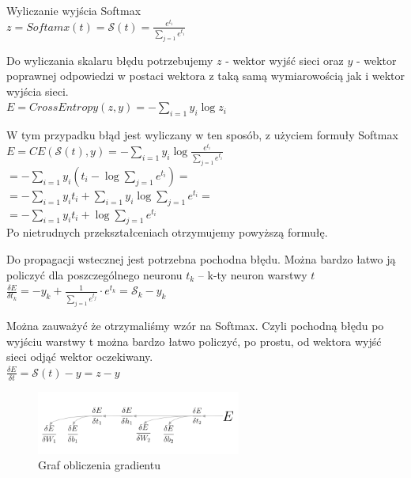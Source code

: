 \documentclass{article}
\begin{document}
\begin{flushleft}
Wyliczanie wyjścia Softmax\\
$z = Softamx(t) = \mathcal{S}(t)= \frac{e^{t_i}}{\sum_{j=1}e^{t_i}}$ \\
\vspace{0.5cm}

Do wyliczania skalaru błędu potrzebujemy $z$ - wektor wyjść sieci oraz $y$ - wektor poprawnej odpowiedzi w postaci wektora z taką samą wymiarowością jak i wektor wyjścia sieci.\\
$E = CrossEntropy(z, y) = -\sum_{i=1}y_i\log z_i$\\
\vspace{0.5cm}

W tym przypadku błąd jest wyliczany w ten sposób, z użyciem formuły Softmax\\
$E = CE(\mathcal{S}(t),y)=-\sum_{i=1}y_i\log\frac{e^{t_i}}{\sum_{j=1}e^{t_i}}$\\
$= -\sum_{i=1}y_i(t_i-\log \sum_{j=1}e^{t_i}) =$\\
$= -\sum_{i=1}y_it_i + \sum_{i=1}y_i\log\sum_{j=1}e^{t_i} =$\\
$= -\sum_{i=1}y_it_i + \log\sum_{j=1}e^{t_i}$\\
Po nietrudnych przekształceniach otrzymujemy powyższą formułę.\\
\vspace{0.5cm}

Do propagacji wstecznej jest potrzebna pochodna błędu. Można bardzo łatwo ją policzyć dla poszczególnego neuronu $t_k$ -- k-ty neuron warstwy $t$ \\
$\frac{\delta E}{\delta t_k} = -y_k + \frac{1}{\sum_{j=1}e^{t_j}}\cdot e^{t_k} = \mathcal{S}_k - y_k$\\
\vspace{0.5cm}

Można zauważyć że otrzymaliśmy wzór na Softmax. Czyli pochodną błędu po wyjściu warstwy t można bardzo łatwo policzyć, po prostu, od wektora wyjść sieci odjąć wektor oczekiwany.\\ 
$\frac{\delta E}{\delta t} = \mathcal{S}(t) - y = z - y$
\end{flushleft}

\begin{figure}[H]
	\centering
	\includegraphics[width=0.6\textwidth,keepaspectratio=true]{gradient_graph}
	\caption{Graf obliczenia gradientu}
	\label{gradien_graph}
\end{figure}
\end{document}

